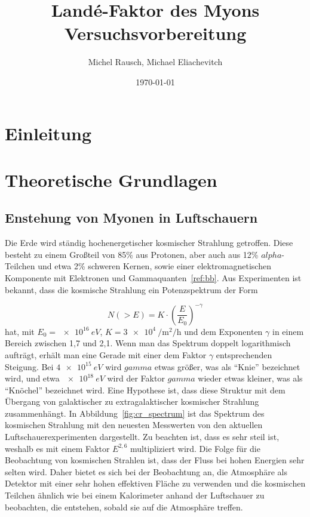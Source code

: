 \documentclass[a4paper,ngerman]{scrartcl}
\title{Landé-Faktor des Myons\\Versuchsvorbereitung}
\date{\today}
\author{Michel Rausch, Michael Eliachevitch}
\begin{document}
\maketitle
\tableofcontents
\newpage

\section{Einleitung}
\label{sec:einfuhrung}


\section{Theoretische Grundlagen}
\label{sec:theorie}

\subsection{Enstehung von Myonen in Luftschauern}
\label{sec:luftschauer}

Die Erde wird ständig hochenergetischer kosmischer Strahlung getroffen. 
Diese besteht zu einem Großteil von 85\% aus Protonen, aber auch aus 12\% $alpha$-Teilchen und etwa 2\% schweren Kernen,
sowie einer elektromagnetischen Komponente mit Elektronen und Gammaquanten~\ref{ref:bb}.
Aus Experimenten ist bekannt, dass die kosmische Strahlung ein Potenzspektrum der Form

\begin{equation}
  N(> E) = K \cdot \left(\frac{E}{E_0}\right)^{-\gamma}
  \label{eq:powerlaw}
\end{equation}
hat, mit $E_0 = \SI{e16}{eV}$, $K = \SI{3e4}{\per\square\meter\per\hour}$ und dem Exponenten $\gamma$ in einem Bereich zwischen 1,7 und 2,1.
Wenn man das Spektrum doppelt logarithmisch aufträgt, erhält man eine Gerade mit einer dem Faktor $\gamma$ entsprechenden Steigung.
Bei $\SI{4e15}{eV}$ wird $gamma$ etwas größer, was als "`Knie"' bezeichnet wird, und etwa $\SI{e18}{eV}$ wird der Faktor $gamma$ wieder etwas kleiner, was als "`Knöchel"' bezeichnet wird. Eine Hypothese ist, dass diese Struktur mit dem Übergang von galaktischer zu extragalaktischer kosmischer Strahlung zusammenhängt. In Abbildung~\ref{fig:cr_spectrum} ist das Spektrum des kosmischen Strahlung mit den neuesten Messwerten von den aktuellen Luftschauerexperimenten dargestellt. Zu beachten ist, dass es sehr steil ist, weshalb es mit einem Faktor $E^{2,6}$ multipliziert wird. Die Folge für die Beobachtung von kosmischen Strahlen ist, dass der Fluss bei hohen Energien sehr selten wird. Daher bietet es sich bei der
Beobachtung an, die Atmosphäre als Detektor mit einer sehr hohen effektiven Fläche zu verwenden und die kosmischen Teilchen ähnlich wie bei einem Kalorimeter anhand der Luftschauer zu beobachten, die entstehen, sobald sie auf die Atmosphäre treffen.\\
 
\end{document}
